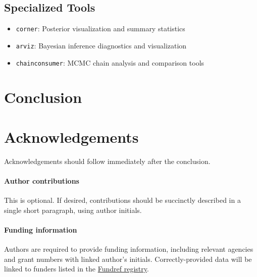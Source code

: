 \documentclass{SciPost}
\begin{document}
\subsection{Specialized Tools}
\begin{itemize}
    \item \texttt{corner}: Posterior visualization and summary statistics
    \item \texttt{arviz}: Bayesian inference diagnostics and visualization
    \item \texttt{chainconsumer}: MCMC chain analysis and comparison tools
\end{itemize}


\section{Conclusion}

\section*{Acknowledgements}
Acknowledgements should follow immediately after the conclusion.

\paragraph{Author contributions}
This is optional. If desired, contributions should be succinctly described in a single short paragraph, using author initials.

\paragraph{Funding information}
Authors are required to provide funding information, including relevant agencies and grant numbers with linked author's initials. Correctly-provided data will be linked to funders listed in the \href{https://www.crossref.org/services/funder-registry/}{\sf Fundref registry}.









\end{document}
